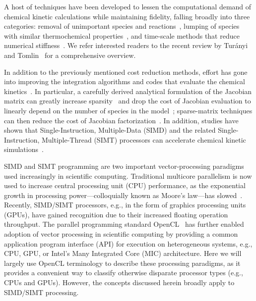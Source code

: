 \documentclass[12pt,number,sort&compress,preprint]{elsarticle}
\newcommand{\revise}[1]{{\sloppy\textcolor{RoyalPurple}{#1}}}  %
\begin{document}
A host of techniques have been developed to lessen the computational demand of chemical kinetic calculations while maintaining fidelity, \revise{falling} broadly into \revise{three} categories: removal of unimportant species and reactions~\cite{Lu:2006bb,Pepiot-Desjardins:2008,Hiremath:2010jw,Niemeyer:2010bt,Curtis:2015},
lumping of species with similar thermochemical properties~\cite{Lu:2007,Ahmed:2007fa,Pepiot:2008kq},
and time-scale methods that reduce numerical stiffness~\cite{Maas:1992ws,Lam:1994ws,Lu:2001ve,Gou:2010}.
\revise{We refer interested readers} to the recent review by Tur\'anyi and Tomlin~\cite{turanyi2016analysis} for a comprehensive overview.

In addition to the previously mentioned cost reduction methods, effort has gone into improving the integration algorithms and codes that evaluate the chemical kinetics~\cite{Gou:2010,SCHWER2002270,Niemeyer:2016aa,GAO2015287}.
In particular, a carefully derived analytical formulation of the Jacobian \revise{matrix can greatly increase sparsity}~\cite{SCHWER2002270} and drop the cost of Jacobian evaluation to \revise{linearly depend} on the number of species in the model~\cite{LU2009192}; \revise{sparse-matrix techniques can then reduce the cost of Jacobian factorization}~\cite{superlu99}.
\revise{In addition, studies have shown that} Single-Instruction, Multiple-Data (SIMD) and the related Single-Instruction, Multiple-Thread (SIMT) processors can accelerate chemical kinetic simulations~\cite{Shi:2012aa,Niemeyer:2014aa,Sewerin20151375,Niemeyer:2016aa,CurtisGPU:2017,stone2018}.

SIMD and SIMT programming are two important vector-processing paradigms used increasingly in scientific computing.
\revise{Traditional multicore parallelism is now used to increase} central processing unit (CPU) performance, \revise{as the exponential growth in processing power}---colloquially known as Moore's law---has slowed~\cite{khan2018science}.
\revise{Recently, SIMD\slash SIMT processors, e.g., in the form of graphics processing units (GPUs), have gained recognition due to their increased floating operation throughput}.
The parallel programming standard OpenCL~\cite{stone2010opencl} has further enabled adoption of vector processing in scientific computing by providing a common application program interface (API) for execution on heterogeneous systems, e.g., CPU, GPU, or Intel's Many Integrated Core (MIC) architecture.
\revise{Here we will} largely use OpenCL terminology to describe these processing paradigms, as it provides a convenient way to classify otherwise disparate processor types (e.g., CPUs and GPUs).
However, the concepts discussed herein \revise{broadly apply} to SIMD\slash SIMT processing.
\end{document}
